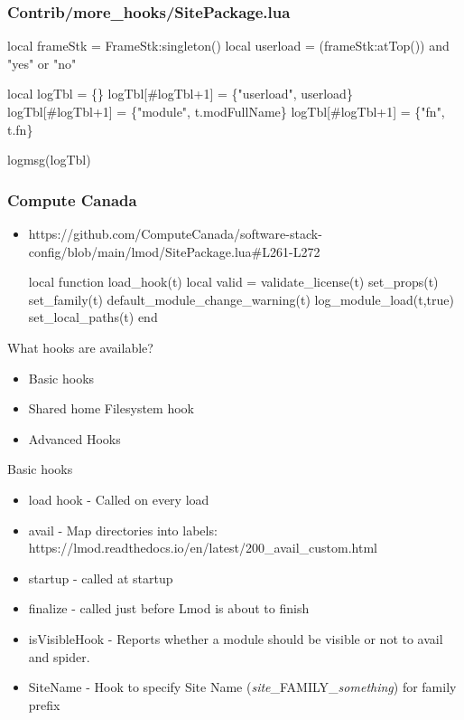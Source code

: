 \documentclass{beamer}
\begin{document}
\begin{frame}[fragile]
  \frametitle{Contrib/more\_hooks/SitePackage.lua}
    {\small
\begin{semiverbatim}
  local frameStk = FrameStk:singleton()
  local userload = (frameStk:atTop()) and
                   "yes" or "no"

  local logTbl       = \{\}
  logTbl[\#logTbl+1]  = \{"userload", userload\}
  logTbl[\#logTbl+1]  = \{"module", t.modFullName\}
  logTbl[\#logTbl+1]  = \{"fn", t.fn\}

  logmsg(logTbl)
\end{semiverbatim}
    }
\end{frame}

\begin{frame}[fragile]
  \frametitle{Compute Canada}
  \begin{itemize}
    \item https://github.com/ComputeCanada/software-stack-config/blob/main/lmod/SitePackage.lua\#L261-L272
    {\small
\begin{semiverbatim}
     local function load\_hook(t)
        local valid = validate\_license(t)
        set\_props(t)
        set\_family(t)
        default\_module\_change\_warning(t)
        log\_module\_load(t,true)
        set\_local\_paths(t)
     end
\end{semiverbatim}
    }
    \end{itemize}
\end{frame}

\begin{frame}{What hooks are available?}
  \begin{itemize}
    \item Basic hooks
    \item Shared home Filesystem hook
    \item Advanced Hooks
  \end{itemize}
\end{frame}

\begin{frame}{Basic hooks}
  \begin{itemize}
    \item load hook - Called on every load
    \item avail - Map directories into labels: https://lmod.readthedocs.io/en/latest/200\_avail\_custom.html
    \item startup - called at startup
    \item finalize - called just before Lmod is about to finish
    \item isVisibleHook - Reports whether a module should be visible
      or not to avail and spider.
    \item SiteName - Hook to specify Site Name (\emph{site}\_FAMILY\_\emph{something}) for family prefix
  \end{itemize}
\end{frame}
\end{document}
